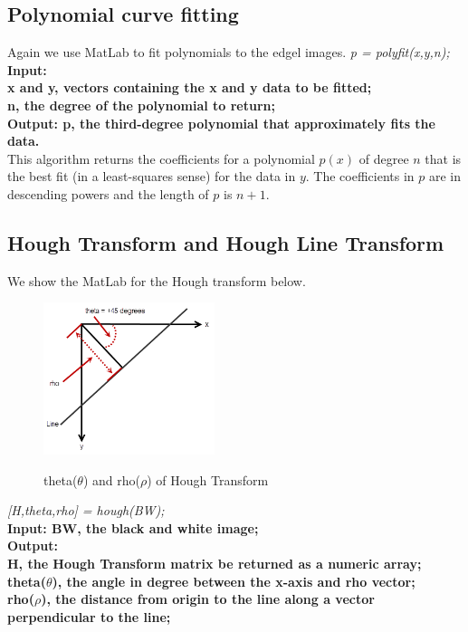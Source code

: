 \subsection{Polynomial curve fitting}

Again we use MatLab to fit polynomials to the edgel images.
\vspace{3mm}
\textit{p = polyfit(x,y,n);}\\
\newline
\textbf{Input: \\x and y, vectors containing the x and y data to be fitted;\\ n, the degree of the polynomial to return;}\\ 
\textbf{Output: p, the third-degree polynomial that approximately fits the data.}\\
\newline
This algorithm returns the coefficients for a polynomial $p(x)$ of degree $n$ 
that is the best fit (in a least-squares sense) for the data in $y$. The 
coefficients in $p$ are in descending powers and the length of $p$ is $n+1$.


\subsection{Hough Transform and Hough Line Transform}

We show the MatLab for the Hough transform below.

\begin{figure}
\includegraphics[width=5cm]{pic/SHT-example.png}\\
\caption{theta($\theta$) and rho($\rho$) of Hough Transform}
\label{fig1}
\end{figure}
\vspace{3mm}
\textit{[H,theta,rho] = hough(BW);}\\
\newline
\textbf{Input: BW, the black and white image;}\\
\textbf{Output:\\ H, the Hough Transform matrix be returned as a numeric array;}\\ 
\textbf{theta($\theta$), the angle in degree between the x-axis and rho vector;}\\
\textbf{rho($\rho$), the distance from origin to the line along a vector perpendicular to the line;}\\


